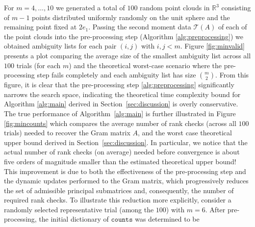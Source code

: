 \documentclass{article}
\theoremstyle{definition}
\renewcommand{\r}{\mathbb{R}}
\renewcommand{\|}{|}
\renewcommand{\t}{\mathcal{T}}
\newcommand{\counts}{\texttt{counts}}
\begin{document}
For $m=4,\dots, 10$ we generated a total of $100$ random point clouds in $\r^3$ consisting of $m-1$ points distributed uniformly randomly on the unit sphere and the remaining point fixed at $2e_1$. Passing the second moment data $\t(A)$ of each of the point clouds into the pre-processing step (Algorithm \ref{alg:preprocessing}) we obtained ambiguity lists for each pair $(i,j)$ with $i,j < m$. Figure \ref{fig:minvalid} presents a plot comparing the average size of the smallest ambiguity list across all $100$ trials (for each $m$) and the theoretical worst-case scenario where the pre-processing step fails completely and each ambiguity list has size $\binom{m}{2}$. From this figure, it is clear that the pre-processing step \ref{alg:preprocessing} significantly narrows the search space, indicating the theoretical time complexity bound for Algorithm \ref{alg:main} derived in Section~\ref{sec:discussion} is overly conservative. The true performance of Algorithm~\ref{alg:main} is further illustrated in Figure \ref{fig:mincounts} which compares the average number of rank checks (across all $100$ trials) needed to recover the Gram matrix $A$, and the worst case theoretical upper bound derived in Section~\ref{sec:discussion}. In particular, we notice that the actual number of rank checks (on average) needed before convergence is about five orders of magnitude smaller than the estimated theoretical upper bound! This improvement is due to both the effectiveness of the pre-processing step and the dynamic updates performed to the Gram matrix, which progressively reduces the set of admissible principal submatrices and, consequently, the number of required rank checks. To illustrate this reduction more explicitly, consider a randomly selected representative trial (among the $100$) with $m=6$. After pre-processing, the initial dictionary of $\counts$ was determined to be 
\end{document}
